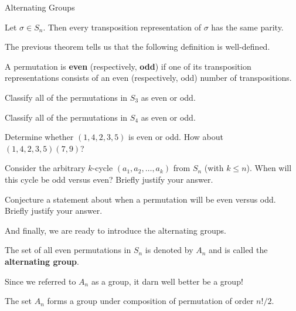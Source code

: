 \begin{section}{Alternating Groups}
\begin{theorem}
Let \(\sigma\in S_n\).  Then every transposition representation of \(\sigma\) has the same parity.
\end{theorem}

The previous theorem tells us that the following definition is well-defined.

\begin{definition}
A permutation is \textbf{even} (respectively, \textbf{odd}) if one of its transposition representations consists of an even (respectively, odd) number of transpositions.
\end{definition}

\begin{exercise}
Classify all of the permutations in \(S_3\) as even or odd.
\end{exercise}

\begin{exercise}
Classify all of the permutations in \(S_4\) as even or odd.
\end{exercise}

\begin{exercise}
Determine whether \((1,4,2,3,5)\) is even or odd.  How about \((1,4,2,3,5)(7,9)\)?
\end{exercise}

\begin{problem}
Consider the arbitrary \(k\)-cycle \((a_1,a_2,\ldots, a_k)\) from \(S_n\) (with \(k\leq n\)).  When will this cycle be odd versus even?  Briefly justify your answer. 
\end{problem}

\begin{problem}
Conjecture a statement about when a permutation will be even versus odd.  Briefly justify your answer.
\end{problem}

And finally, we are ready to introduce the alternating groups.

\begin{definition}
The set of all even permutations in \(S_n\) is denoted by \(A_n\) and is called the \textbf{alternating group}.
\end{definition}

Since we referred to \(A_n\) as a group, it darn well better be a group!

\begin{theorem}
The set \(A_n\) forms a group under composition of permutation of order \(n!/2\).
\end{theorem}


\end{section}
